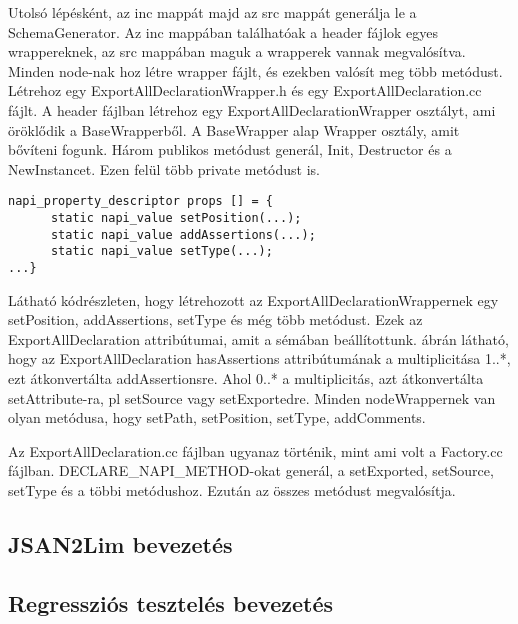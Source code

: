 \noindent

Utolsó lépésként, az inc mappát majd az src mappát generálja le a SchemaGenerator.
Az inc mappában találhatóak a header fájlok egyes wrappereknek, az src mappában maguk a wrapperek vannak megvalósítva.
Minden node-nak hoz létre wrapper fájlt, és ezekben valósít meg több metódust.
Létrehoz egy ExportAllDeclarationWrapper.h és egy ExportAllDeclaration.cc fájlt.
A header fájlban létrehoz egy ExportAllDeclarationWrapper osztályt, ami öröklődik a BaseWrapperből. A BaseWrapper alap Wrapper osztály, amit bővíteni fogunk.
Három publikos metódust generál, Init, Destructor és a NewInstancet.
Ezen felül több private metódust is.

\begin{lstlisting}[caption={ExportAllDeclaration.h fájl}, label={lst:ExportAllDeclaration_header}, language={CStyle}]
napi_property_descriptor props [] = {
      static napi_value setPosition(...);
      static napi_value addAssertions(...);
      static napi_value setType(...);
...}
\end{lstlisting}

Látható  kódrészleten, hogy létrehozott az ExportAllDeclarationWrappernek egy setPosition, addAssertions, setType és még több metódust.
Ezek az ExportAllDeclaration attribútumai, amit a sémában beállítottunk.
 ábrán látható, hogy az ExportAllDeclaration hasAssertions attribútumának a multiplicitása 1..*, ezt átkonvertálta addAssertionsre.
Ahol 0..* a multiplicitás, azt átkonvertálta setAttribute-ra, pl setSource vagy setExportedre.
Minden nodeWrappernek van olyan metódusa, hogy setPath, setPosition, setType, addComments.

\noindent

Az ExportAllDeclaration.cc fájlban ugyanaz történik, mint ami volt a Factory.cc fájlban. DECLARE\_NAPI\_METHOD-okat generál, a setExported, setSource, setType és a többi metódushoz.
Ezután az összes metódust megvalósítja.

\subsection{JSAN2Lim bevezetés}

\subsection{Regressziós tesztelés bevezetés}
